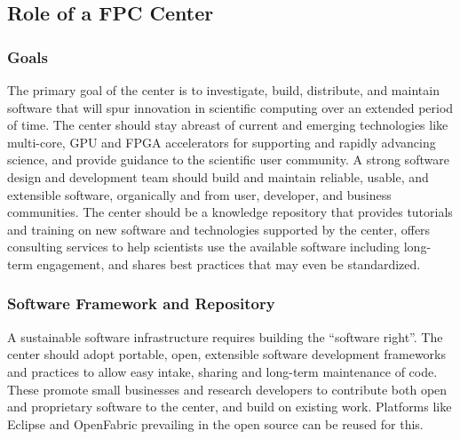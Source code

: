 \subsection{Role of a FPC Center}
%
%
%
%
%

\subsubsection{Goals}
The primary goal of the center is to investigate, build, distribute, and maintain software that will spur innovation in scientific computing over an extended period of time. The center should stay abreast of current and emerging technologies like multi-core, GPU and FPGA accelerators for supporting and rapidly advancing science, and provide guidance to the scientific user community. A strong software design and development team should build and maintain reliable, usable, and extensible software, organically and from user, developer, and business communities. The center should be a knowledge repository that provides tutorials and training on new software and technologies supported by the center, offers consulting services to help scientists use the available software including long-term engagement, and shares best practices that may even be standardized.

\subsubsection{Software Framework and Repository}
A sustainable software infrastructure requires building the “software right”. The center should adopt portable, open, extensible software development frameworks and practices to allow easy intake, sharing and long-term maintenance of code. These promote small businesses and research developers to contribute both open and proprietary software to the center, and build on existing work. Platforms like Eclipse and OpenFabric prevailing in the open source can be reused for this.


